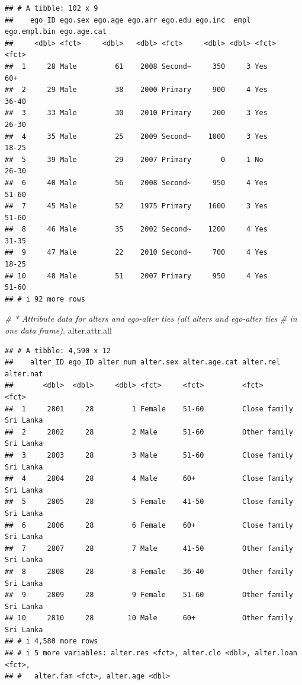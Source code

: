 \documentclass[
]{book}
\newenvironment{Shaded}{\begin{snugshade}}{\end{snugshade}}
\newcommand{\CommentTok}[1]{\textcolor[rgb]{0.56,0.35,0.01}{\textit{#1}}}
\newcommand{\NormalTok}[1]{#1}
\begin{document}
\begin{verbatim}
## # A tibble: 102 x 9
##    ego_ID ego.sex ego.age ego.arr ego.edu ego.inc  empl ego.empl.bin ego.age.cat
##     <dbl> <fct>     <dbl>   <dbl> <fct>     <dbl> <dbl> <fct>        <fct>      
##  1     28 Male         61    2008 Second~     350     3 Yes          60+        
##  2     29 Male         38    2000 Primary     900     4 Yes          36-40      
##  3     33 Male         30    2010 Primary     200     3 Yes          26-30      
##  4     35 Male         25    2009 Second~    1000     3 Yes          18-25      
##  5     39 Male         29    2007 Primary       0     1 No           26-30      
##  6     40 Male         56    2008 Second~     950     4 Yes          51-60      
##  7     45 Male         52    1975 Primary    1600     3 Yes          51-60      
##  8     46 Male         35    2002 Second~    1200     4 Yes          31-35      
##  9     47 Male         22    2010 Second~     700     4 Yes          18-25      
## 10     48 Male         51    2007 Primary     950     4 Yes          51-60      
## # i 92 more rows
\end{verbatim}

\begin{Shaded}
\begin{Highlighting}[]
\CommentTok{\# * Attribute data for alters and ego{-}alter ties (all alters and ego{-}alter ties }
\CommentTok{\# in one data frame). }
\NormalTok{alter.attr.all}
\end{Highlighting}
\end{Shaded}

\begin{verbatim}
## # A tibble: 4,590 x 12
##    alter_ID ego_ID alter_num alter.sex alter.age.cat alter.rel    alter.nat
##       <dbl>  <dbl>     <dbl> <fct>     <fct>         <fct>        <fct>    
##  1     2801     28         1 Female    51-60         Close family Sri Lanka
##  2     2802     28         2 Male      51-60         Other family Sri Lanka
##  3     2803     28         3 Male      51-60         Close family Sri Lanka
##  4     2804     28         4 Male      60+           Close family Sri Lanka
##  5     2805     28         5 Female    41-50         Close family Sri Lanka
##  6     2806     28         6 Female    60+           Close family Sri Lanka
##  7     2807     28         7 Male      41-50         Other family Sri Lanka
##  8     2808     28         8 Female    36-40         Other family Sri Lanka
##  9     2809     28         9 Female    51-60         Other family Sri Lanka
## 10     2810     28        10 Male      60+           Other family Sri Lanka
## # i 4,580 more rows
## # i 5 more variables: alter.res <fct>, alter.clo <dbl>, alter.loan <fct>,
## #   alter.fam <fct>, alter.age <dbl>
\end{verbatim}
\end{document}
